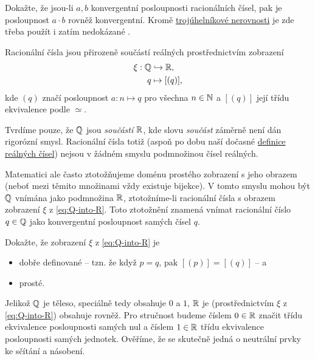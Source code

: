 \begin{exercise}{}{}
 Dokažte, že jsou-li $a,b$ konvergentní posloupnosti racionálních čísel, pak je
 posloupnost $a \cdot b$ rovněž konvergentní. Kromě
 \hyperref[lem:trojuhelnikova-nerovnost]{trojúhelníkové nerovnosti} je zde třeba
 použít i zatím nedokázané .
\end{exercise}

Racionální čísla jsou přirozeně součástí reálných prostřednictvím zobrazení
\begin{equation}
 \label{eq:Q-into-R}
 \begin{split}
  \xi: \mathbb{Q} &\hookrightarrow \mathbb{R},\\
  q &\mapsto [(q)],
 \end{split}
\end{equation}
kde $(q)$ značí posloupnost $a: n \mapsto q$ pro všechna $n \in \mathbb{N}$ a $[(q)]$
její třídu ekvivalence podle $ \simeq $.

\begin{warning}{}{}
 Tvrdíme pouze, že $\mathbb{Q}$ jsou \emph{součástí} $\mathbb{R}$, kde slovu \emph{součást}
 záměrně není dán rigorózní smysl. Racionální čísla totiž (aspoň po dobu naší
 dočasné \hyperref[def:realna-cisla]{definice reálných čísel}) nejsou v žádném
 smyslu podmnožinou čísel reálných.

 Matematici ale často ztotožňujeme doménu prostého zobrazení s jeho obrazem
 (neboť mezi těmito množinami vždy existuje bijekce). V tomto smyslu mohou být
 $\mathbb{Q}$ vnímána jako podmnožina $\mathbb{R}$, ztotožníme-li racionální čísla s obrazem
 zobrazení $\xi$ z \eqref{eq:Q-into-R}. Toto ztotožnění znamená vnímat
 racionální číslo $q \in \mathbb{Q}$ jako konvergentní posloupnost samých čísel $q$.
\end{warning}

\begin{exercise}{}{}
 Dokažte, že zobrazení $\xi$ z \eqref{eq:Q-into-R} je
 \begin{itemize}
  \item dobře definované -- tzn. že když $p = q$, pak $[(p)] = [(q)]$ -- a
  \item prosté.
 \end{itemize}
\end{exercise}

Jelikož $\mathbb{Q}$ je těleso, speciálně tedy obsahuje $0$ a $1$, $\mathbb{R}$ je
(prostřednictvím $\xi$ z \eqref{eq:Q-into-R}) obsahuje rovněž. Pro stručnost
budeme číslem $0 \in \mathbb{R}$ značit třídu ekvivalence posloupnosti samých nul a
číslem $1 \in \mathbb{R}$ třídu ekvivalence posloupnosti samých jednotek. Ověříme, že se
skutečně jedná o neutrální prvky ke sčítání a násobení.

